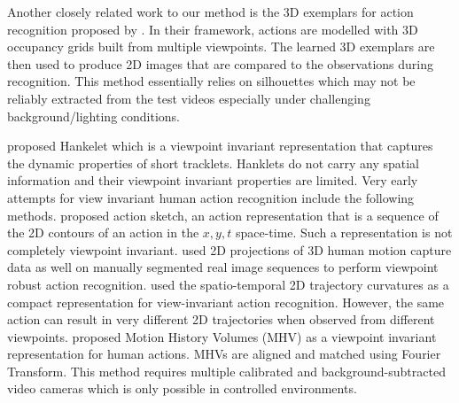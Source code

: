 \documentclass[twocolumn]{svjour3}          \smartqed  \usepackage{graphicx}
\begin{document}
Another closely related work to our method is the 3D exemplars for action recognition proposed by \citet{weinland2007action}. In their framework, actions are modelled with 3D occupancy grids built from multiple viewpoints. The learned 3D exemplars are then used to produce 2D images that are compared to the observations during recognition. This method essentially  relies on silhouettes which may not be reliably extracted from the test videos especially under challenging background/lighting conditions.

\citet{Hankelets} proposed Hankelet which is a viewpoint invariant representation that captures the dynamic properties of short tracklets. Hanklets do not carry any spatial information and their viewpoint invariant properties are limited. Very early attempts for view invariant human action recognition include the following methods. \citet{yilmaz2005actions} proposed action sketch, an action representation that is a sequence of the 2D contours of an action in the $x,y,t$ space-time. Such a representation is not completely viewpoint invariant. \citet{parameswaran2006view} used 2D projections of 3D human motion capture data as well on manually segmented real image sequences to perform viewpoint robust action recognition. \citet{rao2002view} used the spatio-temporal 2D trajectory curvatures as a compact representation for view-invariant action recognition. However, the same action can result in very different 2D trajectories when observed from different viewpoints. \citet{weinland2006free} proposed Motion History Volumes (MHV) as a viewpoint invariant representation for human actions. MHVs are aligned and matched using Fourier Transform. This method requires multiple calibrated and background-subtracted video cameras which is only possible in controlled environments. 
\end{document}
